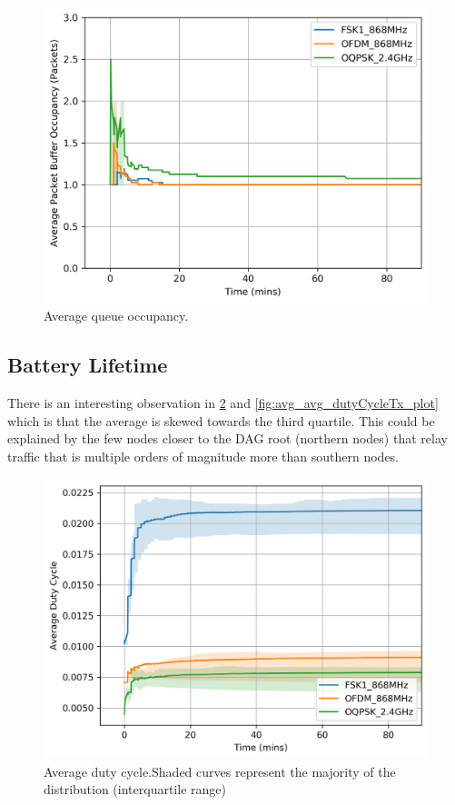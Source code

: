 \documentclass[journal]{IEEEtran}
\begin{document}
\begin{figure}
	\centering
	\includegraphics[width=0.90\columnwidth]{avg_bufferSize_plot}
	\caption{Average queue occupancy.}
    \label{fig:avg_bufferSize_plot}
\end{figure}

\subsection{Battery Lifetime}
\label{sec:battery_lifetime}

There is an interesting observation in \ref{fig:avg_avg_dutyCycle_plot} and \ref{fig:avg_avg_dutyCycleTx_plot} which is that the average is skewed towards the third quartile.
This could be explained by the few nodes closer to the DAG root (northern nodes) that relay traffic that is multiple orders of magnitude more than southern nodes. 

\begin{figure}
	\centering
	\includegraphics[width=0.90\columnwidth]{avg_avg_dutyCycle_plot}
	\caption{Average duty cycle.Shaded curves represent the majority of the distribution (interquartile range)}
    \label{fig:avg_avg_dutyCycle_plot}
\end{figure}
\end{document}
